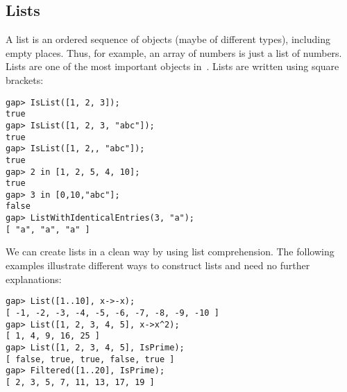 \subsection{Lists}

A list is an ordered sequence of objects (maybe of different types), including
empty places. Thus, for example, an array of numbers 
is just a list of numbers. Lists are one of the most important
objects in~\GAP. 
Lists are written using square brackets:
\begin{lstlisting}
gap> IsList([1, 2, 3]);
true
gap> IsList([1, 2, 3, "abc"]);
true
gap> IsList([1, 2,, "abc"]);
true
gap> 2 in [1, 2, 5, 4, 10];
true
gap> 3 in [0,10,"abc"];
false
gap> ListWithIdenticalEntries(3, "a");
[ "a", "a", "a" ]
\end{lstlisting}

We can create lists in a clean way 
by using list comprehension. 
The following examples illustrate 
different ways to construct lists and 
need no
further explanations:
\begin{lstlisting}
gap> List([1..10], x->-x);
[ -1, -2, -3, -4, -5, -6, -7, -8, -9, -10 ]
gap> List([1, 2, 3, 4, 5], x->x^2);
[ 1, 4, 9, 16, 25 ]
gap> List([1, 2, 3, 4, 5], IsPrime);
[ false, true, true, false, true ]
gap> Filtered([1..20], IsPrime);
[ 2, 3, 5, 7, 11, 13, 17, 19 ]
\end{lstlisting}

